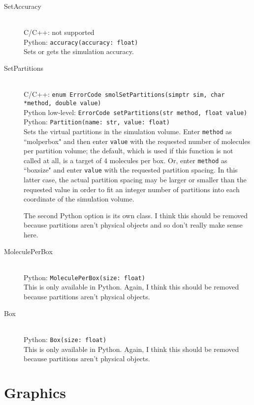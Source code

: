 \documentclass {book}
\newcommand {\ttt} {\texttt}
\begin{document}
\begin{description}
\item[SetAccuracy]
\hfill \\
C/C++: not supported\\
Python: \ttt{accuracy(accuracy: float)}\\
Sets or gets the simulation accuracy.

\item[SetPartitions]
\hfill \\
C/C++: \ttt{enum ErrorCode smolSetPartitions(simptr sim, char *method, double value)}\\
Python low-level: \ttt{ErrorCode setPartitions(str method, float value)}\\
Python: \ttt{Partition(name: str, value: float)}\\
Sets the virtual partitions in the simulation volume. Enter \ttt{method} as ``molperbox" and then enter \ttt{value} with the requested number of molecules per partition volume; the default, which is used if this function is not called at all, is a target of 4 molecules per box. Or, enter \ttt{method} as ``boxsize" and enter \ttt{value} with the requested partition spacing. In this latter case, the actual partition spacing may be larger or smaller than the requested value in order to fit an integer number of partitions into each coordinate of the simulation volume.

The second Python option is its own class. I think this should be removed because partitions aren't physical objects and so don't really make sense here.

\item[MoleculePerBox]
\hfill \\
Python: \ttt{MoleculePerBox(size: float)}\\
This is only available in Python. Again, I think this should be removed because partitions aren't physical objects.

\item[Box]
\hfill \\
Python: \ttt{Box(size: float)}\\
This is only available in Python. Again, I think this should be removed because partitions aren't physical objects.


\end{description}

\section{Graphics}
\end{document}

